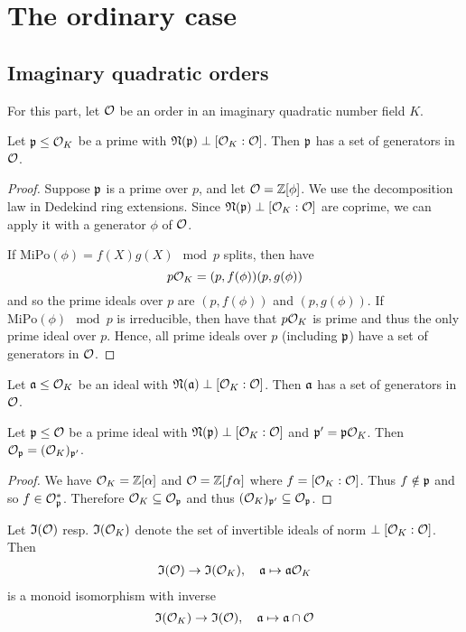 
\section{The ordinary case}

\subsection{Imaginary quadratic orders}
For this part, let $\mathcal{O}$ be an order in an imaginary quadratic number field $K$.
\begin{lemma}
    Let $\mathfrak{p} \leq \mathcal{O}_K$ be a prime with $\mathfrak{N}(\mathfrak{p}) \perp [\mathcal{O}_K : \mathcal{O}]$.
    Then $\mathfrak{p}$ has a set of generators in $\mathcal{O}$.
\end{lemma}
\begin{proof}
    Suppose $\mathfrak{p}$ is a prime over $p$, and let $\mathcal{O} = \mathbb{Z}[\phi]$.
    We use the decomposition law in Dedekind ring extensions.
    Since $\mathfrak{N}(\mathfrak{p}) \perp [\mathcal{O}_K : \mathcal{O}]$ are coprime, we can apply it with a generator $\phi$ of $\mathcal{O}$.

    If $\mathrm{MiPo}(\phi) = f(X)g(X) \mod p$ splits, then have
    \begin{equation*}
        p\mathcal{O}_K = (p, f(\phi))(p, g(\phi))
    \end{equation*}
    and so the prime ideals over $p$ are $(p, f(\phi))$ and $(p, g(\phi))$.
    If $\mathrm{MiPo}(\phi) \mod p$ is irreducible, then have that $p\mathcal{O}_K$ is prime and thus the only prime ideal over $p$.
    Hence, all prime ideals over $p$ (including $\mathfrak{p}$) have a set of generators in $\mathcal{O}$.
\end{proof}
\begin{corollary}
    \label{prop:generators_in_order}
    Let $\mathfrak{a} \leq \mathcal{O}_K$ be an ideal with $\mathfrak{N}(\mathfrak{a}) \perp [\mathcal{O}_K : \mathcal{O}]$. Then $\mathfrak{a}$ has a set of generators in $\mathcal{O}$.
\end{corollary}
\begin{prop}
    Let $\mathfrak{p} \leq \mathcal{O}$ be a prime ideal with $\mathfrak{N}(\mathfrak{p}) \perp [\mathcal{O}_K : \mathcal{O}]$ and $\mathfrak{p}' = \mathfrak{p}\mathcal{O}_K$.
    Then $\mathcal{O}_{\mathfrak{p}} = (\mathcal{O}_K)_{\mathfrak{p}'}$.
\end{prop}
\begin{proof}
    We have $\mathcal{O}_K = \mathbb{Z}[\alpha]$ and $\mathcal{O} = \mathbb{Z}[f\alpha]$ where $f = [\mathcal{O}_K : \mathcal{O}]$.
    Thus $f \notin \mathfrak{p}$ and so $f \in \mathcal{O}_{\mathfrak{p}}^*$.
    Therefore $\mathcal{O}_K \subseteq \mathcal{O}_{\mathfrak{p}}$ and thus $(\mathcal{O}_K)_{\mathfrak{p}'} \subseteq \mathcal{O}_{\mathfrak{p}}$.
\end{proof}
\begin{prop}
    \label{prop:coprime_ideals_order}
    Let $\mathfrak{I}(\mathcal{O})$ resp. $\mathfrak{I}(\mathcal{O}_K)$ denote the set of invertible ideals of norm $\perp [\mathcal{O}_K : \mathcal{O}]$.
    Then
    \begin{align*}
        \mathfrak{I}(\mathcal{O}) \to \mathfrak{I}(\mathcal{O}_K), \quad \mathfrak{a} \mapsto \mathfrak{a}\mathcal{O}_K
    \end{align*}
    is a monoid isomorphism with inverse
    \begin{equation*}
        \mathfrak{I}(\mathcal{O}_K) \to \mathfrak{I}(\mathcal{O}), \quad \mathfrak{a} \mapsto \mathfrak{a} \cap \mathcal{O}
    \end{equation*}
\end{prop}
